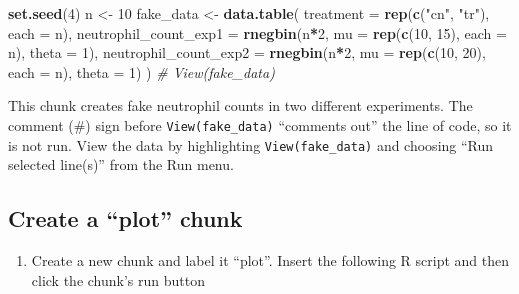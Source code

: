 \documentclass[]{book}
\newenvironment{Shaded}{\begin{snugshade}}{\end{snugshade}}
\newcommand{\CommentTok}[1]{\textcolor[rgb]{0.56,0.35,0.01}{\textit{#1}}}
\newcommand{\DataTypeTok}[1]{\textcolor[rgb]{0.13,0.29,0.53}{#1}}
\newcommand{\DecValTok}[1]{\textcolor[rgb]{0.00,0.00,0.81}{#1}}
\newcommand{\KeywordTok}[1]{\textcolor[rgb]{0.13,0.29,0.53}{\textbf{#1}}}
\newcommand{\NormalTok}[1]{#1}
\newcommand{\OperatorTok}[1]{\textcolor[rgb]{0.81,0.36,0.00}{\textbf{#1}}}
\newcommand{\StringTok}[1]{\textcolor[rgb]{0.31,0.60,0.02}{#1}}
\providecommand{\tightlist}{%
  \setlength{\itemsep}{0pt}\setlength{\parskip}{0pt}}
\begin{document}
\begin{Shaded}
\begin{Highlighting}[]
\KeywordTok{set.seed}\NormalTok{(}\DecValTok{4}\NormalTok{)}
\NormalTok{n <-}\StringTok{ }\DecValTok{10}
\NormalTok{fake_data <-}\StringTok{ }\KeywordTok{data.table}\NormalTok{(}
    \DataTypeTok{treatment =} \KeywordTok{rep}\NormalTok{(}\KeywordTok{c}\NormalTok{(}\StringTok{"cn"}\NormalTok{, }\StringTok{"tr"}\NormalTok{), }\DataTypeTok{each =}\NormalTok{ n),}
    \DataTypeTok{neutrophil_count_exp1 =} \KeywordTok{rnegbin}\NormalTok{(n}\OperatorTok{*}\DecValTok{2}\NormalTok{, }
                                    \DataTypeTok{mu =} \KeywordTok{rep}\NormalTok{(}\KeywordTok{c}\NormalTok{(}\DecValTok{10}\NormalTok{, }\DecValTok{15}\NormalTok{), }\DataTypeTok{each =}\NormalTok{ n),}
                                    \DataTypeTok{theta =} \DecValTok{1}\NormalTok{),}
    \DataTypeTok{neutrophil_count_exp2 =} \KeywordTok{rnegbin}\NormalTok{(n}\OperatorTok{*}\DecValTok{2}\NormalTok{, }
                                    \DataTypeTok{mu =} \KeywordTok{rep}\NormalTok{(}\KeywordTok{c}\NormalTok{(}\DecValTok{10}\NormalTok{, }\DecValTok{20}\NormalTok{), }\DataTypeTok{each =}\NormalTok{ n),}
                                    \DataTypeTok{theta =} \DecValTok{1}\NormalTok{)}
\NormalTok{)}
\CommentTok{# View(fake_data)}
\end{Highlighting}
\end{Shaded}

This chunk creates fake neutrophil counts in two different experiments. The comment (\#) sign before \texttt{View(fake\_data)} ``comments out'' the line of code, so it is not run. View the data by highlighting \texttt{View(fake\_data)} and choosing ``Run selected line(s)'' from the Run menu.

\hypertarget{create-a-plot-chunk}{%
\subsection{Create a ``plot'' chunk}\label{create-a-plot-chunk}}

\begin{enumerate}
\def\labelenumi{\arabic{enumi}.}
\setcounter{enumi}{4}
\tightlist
\item
  Create a new chunk and label it ``plot''. Insert the following R script and then click the chunk's run button
\end{enumerate}
\end{document}
